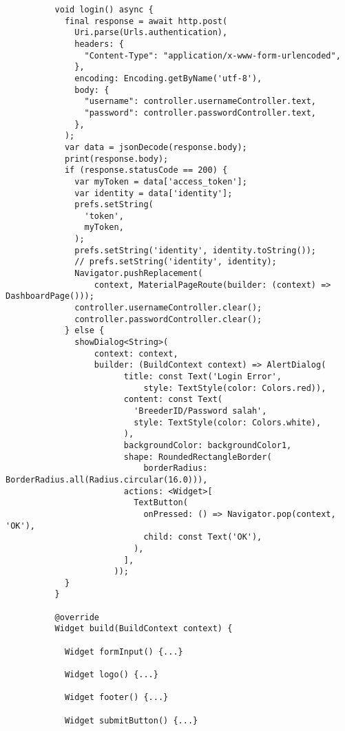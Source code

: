 \begin{lstlisting}
          void login() async {
            final response = await http.post(
              Uri.parse(Urls.authentication),
              headers: {
                "Content-Type": "application/x-www-form-urlencoded",
              },
              encoding: Encoding.getByName('utf-8'),
              body: {
                "username": controller.usernameController.text,
                "password": controller.passwordController.text,
              },
            );
            var data = jsonDecode(response.body);
            print(response.body);
            if (response.statusCode == 200) {
              var myToken = data['access_token'];
              var identity = data['identity'];
              prefs.setString(
                'token',
                myToken,
              );
              prefs.setString('identity', identity.toString());
              // prefs.setString('identity', identity);
              Navigator.pushReplacement(
                  context, MaterialPageRoute(builder: (context) => DashboardPage()));
              controller.usernameController.clear();
              controller.passwordController.clear();
            } else {
              showDialog<String>(
                  context: context,
                  builder: (BuildContext context) => AlertDialog(
                        title: const Text('Login Error',
                            style: TextStyle(color: Colors.red)),
                        content: const Text(
                          'BreederID/Password salah',
                          style: TextStyle(color: Colors.white),
                        ),
                        backgroundColor: backgroundColor1,
                        shape: RoundedRectangleBorder(
                            borderRadius: BorderRadius.all(Radius.circular(16.0))),
                        actions: <Widget>[
                          TextButton(
                            onPressed: () => Navigator.pop(context, 'OK'),
                            child: const Text('OK'),
                          ),
                        ],
                      ));
            }
          }
        
          @override
          Widget build(BuildContext context) {
        
            Widget formInput() {...}
        
            Widget logo() {...}
        
            Widget footer() {...}
        
            Widget submitButton() {...}
        

\end{lstlisting}

